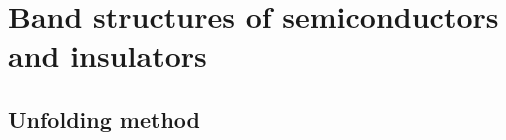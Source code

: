 \cleardoublepage
\chapter{Band structures of semiconductors and insulators\label{ch:band-structures}}

\section{Unfolding method\label{sec:unfolding-method}}

